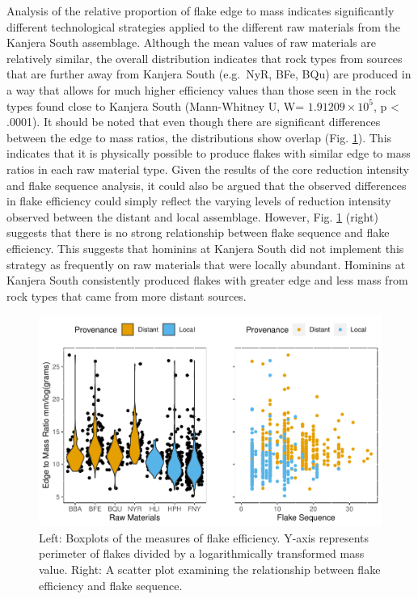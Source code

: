 \documentclass[]{elsarticle} %
\makeatletter
\def\maxwidth{\ifdim\Gin@nat@width>\linewidth\linewidth
\else\Gin@nat@width\fi}
\let\Oldincludegraphics\includegraphics
\renewcommand{\includegraphics}[1]{\Oldincludegraphics[width=\maxwidth]{#1}}
\makeatother
\begin{document}
Analysis of the relative proportion of flake edge to mass indicates
significantly different technological strategies applied to the
different raw materials from the Kanjera South assemblage. Although the
mean values of raw materials are relatively similar, the overall
distribution indicates that rock types from sources that are further
away from Kanjera South (e.g.~NyR, BFe, BQu) are produced in a way that
allows for much higher efficiency values than those seen in the rock
types found close to Kanjera South (Mann-Whitney U, W=
\ensuremath{1.91209\times 10^{5}}, p \textless{} .0001). It should be
noted that even though there are significant differences between the
edge to mass ratios, the distributions show overlap (Fig.
\ref{flake_efficiency}). This indicates that it is physically possible
to produce flakes with similar edge to mass ratios in each raw material
type. Given the results of the core reduction intensity and flake
sequence analysis, it could also be argued that the observed differences
in flake efficiency could simply reflect the varying levels of reduction
intensity observed between the distant and local assemblage. However,
Fig. \ref{flake_efficiency} (right) suggests that there is no strong
relationship between flake sequence and flake efficiency. This suggests
that hominins at Kanjera South did not implement this strategy as
frequently on raw materials that were locally abundant. Hominins at
Kanjera South consistently produced flakes with greater edge and less
mass from rock types that came from more distant sources.

\begin{figure}
\centering
\includegraphics{HUMEV-D-20-00115_revised_draft_files/figure-latex/fig-6-1.pdf}
\caption{Left: Boxplots of the measures of flake efficiency. Y-axis
represents perimeter of flakes divided by a logarithmically transformed
mass value. Right: A scatter plot examining the relationship between
flake efficiency and flake sequence. \label{flake_efficiency}}
\end{figure}
\end{document}
